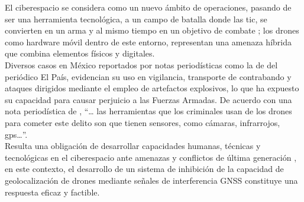 
\begin{justify}
    El ciberespacio se considera como un nuevo ámbito de operaciones, pasando de ser una herramienta tecnológica,
    a un campo de batalla donde las \gls{tic}, se convierten en un arma y
    al mismo tiempo en un objetivo de combate \parencite{defensa2022manual}; los drones como hardware móvil dentro de este entorno,
    representan una amenaza híbrida que combina elementos físicos y digitales.\\

    \noindent Diversos casos en México reportados por notas periodísticas como la de \textcite{santos2022drones} del periódico El País,
    evidencian su uso en vigilancia, transporte de contrabando y ataques dirigidos mediante
    el empleo de artefactos explosivos, lo que ha expuesto su capacidad para causar perjuicio a las Fuerzas Armadas.
    De acuerdo con una nota periodística de \textcite{radioformula2024drones}, “… las herramientas que los criminales usan de los drones
    para cometer este delito son que tienen sensores, como cámaras, infrarrojos, \gls{gps}…”.\\

    \noindent Resulta una obligación de desarrollar capacidades humanas, técnicas y tecnológicas en el
    ciberespacio ante amenazas y conflictos de última generación \parencite{defensa2022manual}, en este contexto,
    el desarrollo de un sistema de inhibición de la capacidad de geolocalización de drones mediante señales de
    interferencia GNSS constituye una respuesta eficaz y factible.
\end{justify}